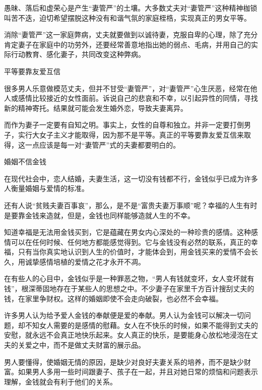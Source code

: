 \documentclass[12pt,UTF8,openany]{ctexbook}
\begin{document}
愚昧、落后和虚荣心是产生“妻管严”的土壤。大多数丈夫对“妻管严”这种精神枷锁叫苦不迭，迫切希望摆脱这种没有和谐气氛的家庭桎梏，实现真正的男女平等。

消除“妻管严”这一家庭弊病，丈夫就要做到以诚待妻，克服自卑的心理，除了充分肯定妻子在家庭中的功劳外，还要经常善意地指出她的弱点、毛病，并用自己的实际行动教育、感化妻子，共同改变这种弊病。





平等要靠友爱互信


很多男人乐意做模范丈夫，但并不甘受“妻管严”，对“妻管严”心生厌恶，经常在他人或感情比较接近的女性面前。诉说自己的悲哀和不幸，以引起异性的同情，寻找新的精神寄托。结果就可能会发生婚外恋，导致夫妻离异。

而作为妻子一定要有自知之明。事实上，女性的自尊和独立。并非一定要打倒男子，实行大女子主义才能取得，因为那不是平等。真正的平等要靠友爱互信来取得，这一点应该是每一对“妻管严”式的夫妻都要明白的。





婚姻不信金钱


在现代社会中，恋人结婚，夫妻生活，这一切没有钱都不行，金钱似乎已成为许多人衡量婚姻与爱情的标准。

还有人说“贫贱夫妻百事哀”，那么，是不是“富贵夫妻万事顺”呢？幸福的人生有时是要靠金钱来造就，但是，金钱也同样能够造就人生的不幸。

知道幸福是无法用金钱买到，它是蕴藏在男女内心深处的一种珍贵的感情。这种感情可以在任何时候、任何地方都能感觉得到。它与金钱没有必然的联系，真正的幸福，只有当你真实地认识到人生的价值时，才能体会到，用金钱买来的爱情不会长久，用诚挚感情培植的爱情之花才永开不凋。

在有些人的心目中，金钱似乎是一种罪恶之物，“男人有钱就变坏，女人变坏就有钱”，根深蒂固地存在于某些人的思想之中。不少妻子在家里千方百计搜刮丈夫的钱，在家里争财权。这样的婚姻即使不会走向破裂，也必然不会幸福。

许多男人认为给予爱人金钱的奉献便是爱的奉献。男人认为金钱可以解决一切问题，却不知女人需要的是感情的慰藉。女人在不快乐的时候，如果不能得到丈夫的安慰，就永远不会真正地快乐起来。女人真正的快乐，是要能身心放松地浸泡在丈夫的关爱之中，而不是做丈夫财富的展示品。

男人要懂得，使婚姻无情的原因，是缺少对良好夫妻关系的培养，而不是缺少财富。如果男人多用一些时间跟妻子、孩子在一起，并且对她日常的烦恼和问题表示理解，金钱就会有利于他们的关系。
\end{document}

